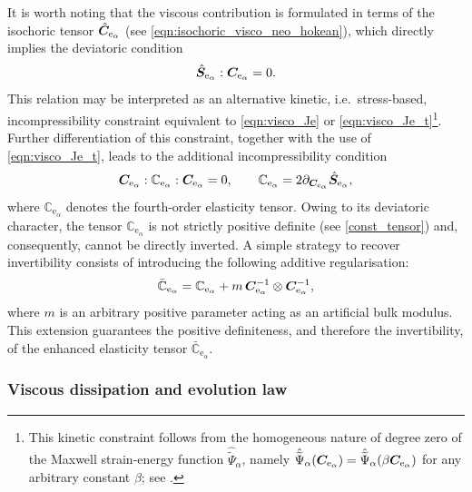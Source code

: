 It is worth noting that the viscous contribution is formulated in terms of the isochoric tensor $\hat{\boldsymbol{C}}_{\mathrm{e}_{\alpha}}$ (see \eqref{eqn:isochoric_visco_neo_hokean}), which directly implies the deviatoric condition
%
\begin{equation}
	\label{eqn:deviatoricS}
	\hat{\boldsymbol{S}}_{\mathrm{e}_{\alpha}}
	:
	\boldsymbol{C}_{\mathrm{e}_{\alpha}}
	=
	0.
\end{equation}
%
This relation may be interpreted as an alternative kinetic, i.e.\ stress-based, incompressibility constraint equivalent to \eqref{eqn:visco_Je} or \eqref{eqn:visco_Je_t}\footnote{This kinetic constraint follows from the homogeneous nature of degree zero of the Maxwell strain-energy function $\hat{\widetilde{\Psi}}_{\alpha}$, namely $\hat{\widetilde{\Psi}}_{\alpha}(\boldsymbol{C}_{\mathrm{e}_{\alpha}})=\hat{\widetilde{\Psi}}_{\alpha}(\beta \boldsymbol{C}_{\mathrm{e}_{\alpha}})$ for any arbitrary constant $\beta$; see \cite{Bonet_book_statics}.}. Further differentiation of this constraint, together with the use of \eqref{eqn:visco_Je_t}, leads to the additional incompressibility condition
%
\begin{equation}
	\label{const_tensor}
	\boldsymbol{C}_{\mathrm{e}_{\alpha}}
	:
	\mathbb{C}_{\mathrm{e}_{\alpha}}
	:
	\boldsymbol{C}_{\mathrm{e}_{\alpha}}
	=
	0,
	\qquad
	\mathbb{C}_{\mathrm{e}_{\alpha}}
	=
	2
	{\partial_{\boldsymbol{C}_{\mathrm{e}_{\alpha}}}}
	\hat{\boldsymbol{S}}_{\mathrm{e}_{\alpha}},
\end{equation}
%
where $\mathbb{C}_{\mathrm{e}_{\alpha}}$ denotes the fourth-order elasticity tensor. Owing to its deviatoric character, the tensor $\mathbb{C}_{\mathrm{e}_{\alpha}}$ is not strictly positive definite (see \eqref{const_tensor}) and, consequently, cannot be directly inverted. 
A simple strategy to recover invertibility consists of introducing the following additive regularisation:
%
\begin{equation}
	\label{eqn:4-order-Ce}
	\bar{\mathbb{C}}_{\mathrm{e}_{\alpha}}
	=
	\mathbb{C}_{\mathrm{e}_{\alpha}}
	+
	m\,
	\boldsymbol{C}_{\mathrm{e}_{\alpha}}^{-1}
	\otimes
	\boldsymbol{C}_{\mathrm{e}_{\alpha}}^{-1},
\end{equation}
%
where $m$ is an arbitrary positive parameter acting as an artificial bulk modulus. This extension guarantees the positive definiteness, and therefore the invertibility, of the enhanced elasticity tensor $\bar{\mathbb{C}}_{\mathrm{e}_{\alpha}}$.



\subsubsection{Viscous dissipation and evolution law}\label{sec::dissipation_law}

